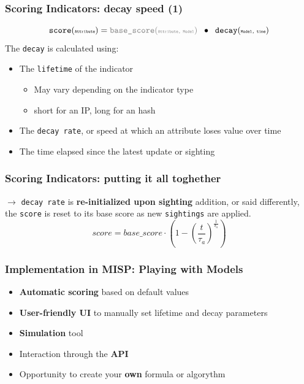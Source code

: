 \begin{frame}
    \frametitle{Scoring Indicators: decay speed (1)}
    $$ \texttt{score}(\texttt{\tiny Attribute}) = {\color{gray}\texttt{base\_score}(\texttt{\tiny Attribute, Model})} \;\;\bullet\;\; \texttt{decay}(\texttt{\tiny Model, time}) $$
    The \texttt{decay} is calculated using:
   \begin{itemize}
       \item The \texttt{lifetime} of the indicator
       \begin{itemize}
           \item May vary depending on the indicator type
           \item short for an IP, long for an hash
       \end{itemize}
       \item The \texttt{decay rate}, or speed at which an attribute loses value over time
       \item The time elapsed since the latest update or sighting
   \end{itemize}
\end{frame}

\begin{frame}
    \frametitle{Scoring Indicators: putting it all toghether}
    $\rightarrow$ \texttt{decay rate} is \textbf{re-initialized upon sighting} addition, or said differently, the \texttt{score} is reset to its base score as new \texttt{sightings} are applied.
    $$score = base\_score \cdot \left( 1 - \left( \frac{t}{\tau_a} \right)^{\frac{1}{\delta_a}} \right) $$
\end{frame}

\begin{frame}
\frametitle{Implementation in MISP: Playing with Models}
    \begin{itemize}
        \item \textbf{Automatic scoring} based on default values
        \item \textbf{User-friendly UI} to manually set lifetime and decay parameters
        \item \textbf{Simulation} tool
        \item Interaction through the \textbf{API}
        \item Opportunity to create your \textbf{own} formula or algorythm
    \end{itemize}
\end{frame}

